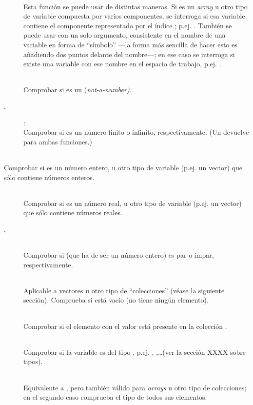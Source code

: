 ﻿\documentclass[spanish]{article}
\begin{document}
\begin{description}
\item[] \hfill \\
  Esta función se puede usar de distintas maneras. Si  es un \emph{array}
  u otro tipo de variable compuesta por varios componentes,
  se interroga si esa variable contiene el componente representado por el índice
  ; p.ej. . También se puede usar con un
  solo argumento, consistente en el nombre de una variable en forma de
  ``símbolo'' ---la forma más sencilla de hacer esto es añadiendo dos
  puntos delante del nombre---; en ese caso se interroga si existe una
  variable con ese nombre en el espacio de trabajo, p.ej.
  .
\item[] \hfill \\
  Comprobar si  es un  (\emph{not-a-number)}.
\item[, ]: \hfill \\
  Comprobar si  es un número finito o infinito, respectivamente.
  (Un  devuelve  para ambas funciones.)
\item[ \hfill \\
  Comprobar si  es un número entero, u otro tipo de variable
  (p.ej. un vector) que sólo contiene números enteros.
\item[\code{isreal(x)}] \hfill \\
  Comprobar si  es un número real, u otro tipo de variable
  (p.ej. un vector) que sólo contiene números reales.
\item[, ] \hfill \\
  Comprobar si  (que ha de ser un número entero) es par o impar, respectivamente.
\item[] \hfill \\
  Aplicable a vectores u otro tipo de ``colecciones'' (véase la siguiente sección).
  Comprueba si  está vacío (no tiene ningún elemento).
\item[] \hfill \\
  Comprobar si el elemento con el valor  está presente en la colección .
\item[] \hfill \\
  Comprobar si la variable  es del tipo , p.ej.
  , ,\ldots (ver la sección XXXX sobre tipos).
\item[] \hfill \\
  Equivalente a , pero también válido para \emph{arrays} u otro tipo
  de colecciones; en el segundo caso comprueba el tipo de todos sus elementos.
\end{description}
\end{document}
